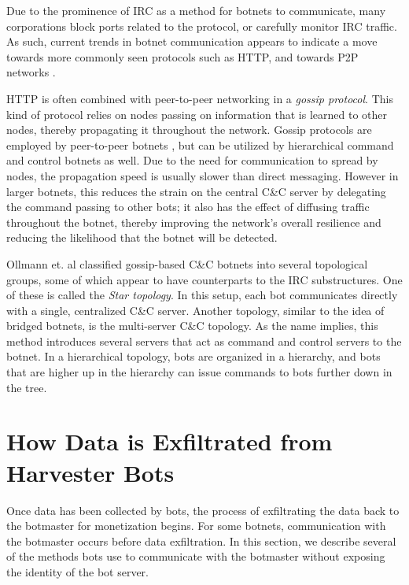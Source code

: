 \documentclass{acm_proc_article-sp}
\begin{document}
Due to the prominence of IRC as a method for botnets to communicate, many corporations block ports related to the protocol, or carefully monitor IRC traffic. As such, current trends in botnet communication appears to indicate a move towards more commonly seen protocols such as HTTP, and towards P2P networks \cite{cooke:survey}.


HTTP is often combined with peer-to-peer networking in a \emph{gossip protocol}. This kind of protocol relies on nodes passing on information that is learned to other nodes, thereby propagating it throughout the network. Gossip protocols are employed by peer-to-peer botnets \cite{defcon:prowling}, but can be utilized by hierarchical command and control botnets as well. Due to the need for communication to spread by nodes, the propagation speed is usually slower than direct messaging. However in larger botnets, this reduces the strain on the central C\&C server by delegating the command passing to other bots; it also has the effect of diffusing traffic throughout the botnet, thereby improving the network's overall resilience and reducing the likelihood that the botnet will be detected.

Ollmann et. al classified gossip-based C\&C botnets into several topological groups\cite{ollmann:topology}, some of which appear to have counterparts to the IRC substructures. One of these is called the \emph{Star topology}. In this setup, each bot communicates directly with a single, centralized C\&C server. Another topology, similar to the idea of bridged botnets, is the multi-server C\&C topology. As the name implies, this method introduces several servers that act as command and control servers to the botnet. In a hierarchical topology, bots are organized in a hierarchy, and bots that are higher up in the hierarchy can issue commands to bots further down in the tree.

\section{How Data is Exfiltrated from Harvester Bots}

Once data has been collected by bots, the process of exfiltrating the data back to the botmaster for monetization begins.  For some botnets, communication with the botmaster occurs before data exfiltration.  In this section, we describe several of the methods bots use to communicate with the botmaster without exposing the identity of the bot server.
\end{document}
